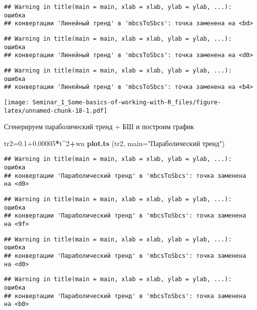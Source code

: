 \documentclass[
]{article}
\newenvironment{Shaded}{\begin{snugshade}}{\end{snugshade}}
\newcommand{\AttributeTok}[1]{\textcolor[rgb]{0.13,0.29,0.53}{#1}}
\newcommand{\DecValTok}[1]{\textcolor[rgb]{0.00,0.00,0.81}{#1}}
\newcommand{\FloatTok}[1]{\textcolor[rgb]{0.00,0.00,0.81}{#1}}
\newcommand{\FunctionTok}[1]{\textcolor[rgb]{0.13,0.29,0.53}{\textbf{#1}}}
\newcommand{\NormalTok}[1]{#1}
\newcommand{\OtherTok}[1]{\textcolor[rgb]{0.56,0.35,0.01}{#1}}
\newcommand{\SpecialCharTok}[1]{\textcolor[rgb]{0.81,0.36,0.00}{\textbf{#1}}}
\newcommand{\StringTok}[1]{\textcolor[rgb]{0.31,0.60,0.02}{#1}}
\begin{document}
\begin{verbatim}
## Warning in title(main = main, xlab = xlab, ylab = ylab, ...): ошибка
## конвертации 'Линейный тренд' в 'mbcsToSbcs': точка заменена на <bd>
\end{verbatim}

\begin{verbatim}
## Warning in title(main = main, xlab = xlab, ylab = ylab, ...): ошибка
## конвертации 'Линейный тренд' в 'mbcsToSbcs': точка заменена на <d0>
\end{verbatim}

\begin{verbatim}
## Warning in title(main = main, xlab = xlab, ylab = ylab, ...): ошибка
## конвертации 'Линейный тренд' в 'mbcsToSbcs': точка заменена на <b4>
\end{verbatim}

\texttt{[image: Seminar\_1\_Some-basics-of-working-with-R\_files/figure-latex/unnamed-chunk-18-1.pdf]}

Сгенерируем параболический тренд + БШ и построим график

\begin{Shaded}
\begin{Highlighting}[]
\NormalTok{tr2}\OtherTok{=}\FloatTok{0.1+0.00005}\SpecialCharTok{*}\NormalTok{t}\SpecialCharTok{\^{}}\DecValTok{2}\SpecialCharTok{+}\NormalTok{wn}
\FunctionTok{plot.ts}\NormalTok{ (tr2, }\AttributeTok{main=}\StringTok{"Параболический тренд"}\NormalTok{)}
\end{Highlighting}
\end{Shaded}

\begin{verbatim}
## Warning in title(main = main, xlab = xlab, ylab = ylab, ...): ошибка
## конвертации 'Параболический тренд' в 'mbcsToSbcs': точка заменена на <d0>
\end{verbatim}

\begin{verbatim}
## Warning in title(main = main, xlab = xlab, ylab = ylab, ...): ошибка
## конвертации 'Параболический тренд' в 'mbcsToSbcs': точка заменена на <9f>
\end{verbatim}

\begin{verbatim}
## Warning in title(main = main, xlab = xlab, ylab = ylab, ...): ошибка
## конвертации 'Параболический тренд' в 'mbcsToSbcs': точка заменена на <d0>
\end{verbatim}

\begin{verbatim}
## Warning in title(main = main, xlab = xlab, ylab = ylab, ...): ошибка
## конвертации 'Параболический тренд' в 'mbcsToSbcs': точка заменена на <b0>
\end{verbatim}
\end{document}
